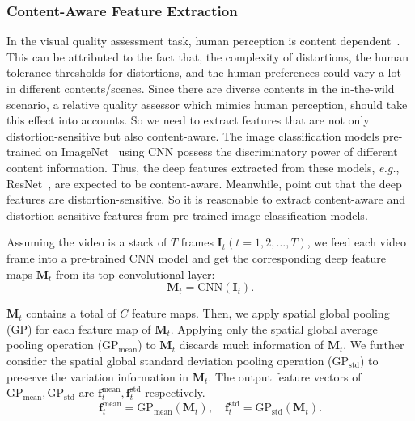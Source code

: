 \documentclass[twocolumn]{svjour3}          \smartqed  \usepackage{graphicx}
\begin{document}
\subsubsection{Content-Aware Feature Extraction}
In the visual quality assessment task, human perception is content dependent~\citep{siahaan2018semantic,triantaphillidou2007image,wang2017videoset,bampis2017study,zhang2018unreasonable,li2019quality,li2019has}. 
This can be attributed to the fact that, the complexity of distortions, the human tolerance thresholds for distortions, and the human preferences could vary a lot in different contents/scenes.
Since there are diverse contents in the in-the-wild scenario, a relative quality assessor which mimics human perception, should take this effect into accounts. 
So we need to extract features that are not only distortion-sensitive but also content-aware.
The image classification models pre-trained on ImageNet~\citep{deng2009imagenet} using CNN possess the discriminatory power of different content information.
Thus, the deep features extracted from these models, \textit{e.g.}, ResNet~\citep{he2016deep}, are expected to be content-aware. 
Meanwhile, \citet{dodge2016understanding} point out that the deep features are distortion-sensitive. 
So it is reasonable to extract content-aware and distortion-sensitive features from pre-trained image classification models.

Assuming the video is a stack of $T$ frames $\mathbf{I}_t (t=1,2,\dots,T)$, we feed each video frame into a pre-trained CNN model and get the corresponding deep feature maps $\mathbf{M}_t$ from its top convolutional layer:
\begin{equation}\label{eq:CNN}
\mathbf{M}_t = \mathrm{CNN}(\mathbf{I}_t).
\end{equation}

$\mathbf{M}_{t}$ contains a total of $C$ feature maps.
Then, we apply spatial global pooling (GP) for each feature map of $\mathbf{M}_{t}$. 
Applying only the spatial global average pooling operation ($\mathrm{GP}_{\mathrm{mean}}$) to $\mathbf{M}_t$ discards much information of $\mathbf{M}_t$. 
We further consider the spatial global standard deviation pooling operation ($\mathrm{GP}_{\mathrm{std}}$) to preserve the variation information in $\mathbf{M}_t$. 
The output feature vectors of $\mathrm{GP}_{\mathrm{mean}}, \mathrm{GP}_{\mathrm{std}}$ are $\mathbf{f}_{t}^{\mathrm{mean}}, \mathbf{f}_{t}^{\mathrm{std}}$ respectively.
\begin{equation}\label{eq:GP}
\mathbf{f}_{t}^{\mathrm{mean}}  = \mathrm{GP}_{\mathrm{mean}}(\mathbf{M}_t),\quad
\mathbf{f}_{t}^{\mathrm{std}}  = \mathrm{GP}_{\mathrm{std}}(\mathbf{M}_t).
\end{equation}
\end{document}

